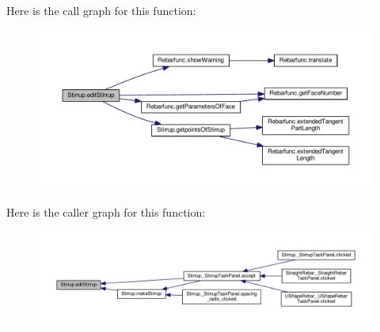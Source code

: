 Here is the call graph for this function\+:\nopagebreak
\begin{figure}[H]
\begin{center}
\leavevmode
\includegraphics[width=350pt]{namespaceStirrup_a1f6d278ace7fe116895dba342e2a3573_cgraph}
\end{center}
\end{figure}




Here is the caller graph for this function\+:\nopagebreak
\begin{figure}[H]
\begin{center}
\leavevmode
\includegraphics[width=350pt]{namespaceStirrup_a1f6d278ace7fe116895dba342e2a3573_icgraph}
\end{center}
\end{figure}


